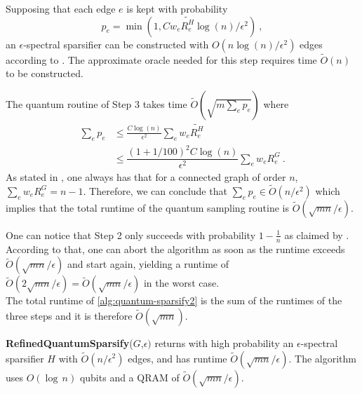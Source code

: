 Supposing that each edge $e$ is kept with probability
$$p_e = \min(1,C w_e \tilde{R^H_e} \log(n)/\epsilon^2) \ ,$$
an $\epsilon$-spectral sparsifier can be constructed with $O(n \log(n)/\epsilon^2)$ edges according to . The approximate oracle needed for this step requires time $\tilde{O}(n)$ to be constructed. %

The quantum routine of Step 3 takes time $\tilde{O}(\sqrt{m \sum_e p_e})$ where
\begin{equation*}
\begin{aligned}
    \sum_e p_e
        & \leq \frac{C \log(n)}{\epsilon^2} \sum_e w_e \tilde{R^H_e} \\
        & \leq \dfrac{(1+1/100)^2 C \log(n)}{\epsilon^2} \sum_e w_e R^G_e \ .
\end{aligned}
\end{equation*}
As stated in \cite{bollobas_modern_1998}, one always has that for a connected graph of order $n$, $\sum_e w_e R^G_e = n-1$. Therefore, we can conclude that $\sum_e p_e \in \tilde{O}(n/\epsilon^2)$ which implies that the total runtime of the quantum sampling routine is $\tilde{O}(\sqrt{mn}/\epsilon)$.

One can notice that Step 2 only succeeds with probability $1-\frac 1n$ as claimed by . According to that, one can abort the algorithm as soon as the runtime exceeds $\tilde{O}(\sqrt{mn}/\epsilon)$ and start again, yielding a runtime of $\tilde{O}(2 \sqrt{mn}/\epsilon) = \tilde{O}(\sqrt{mn}/\epsilon)$ in the worst case.\\

The total runtime of \autoref{alg:quantum-sparsify2} is the sum of the runtimes of the three steps and it is therefore $\tilde{O}(\sqrt{mn})$.


\begin{theorem}\label{th:raf-spectral-sparisifaction}
\textbf{RefinedQuantumSparsify}($G$,$\epsilon)$ returns with high probability an
$\epsilon$-spectral sparsifier $H$ with $\tilde{O}(n/\epsilon^2)$ edges, and has
runtime $\tilde{O}(\sqrt{mn}/\epsilon)$. The algorithm uses $O(\log\, n)$ qubits
and a QRAM of $\tilde{O}(\sqrt{mn}/\epsilon)$.
\end{theorem}
